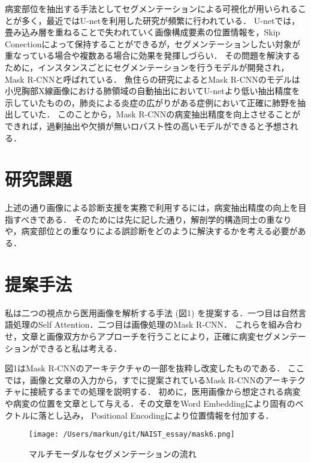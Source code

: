 \documentclass[a4j,10pt,twocolumn]{jarticle}
\begin{document}
病変部位を抽出する手法としてセグメンテーションによる可視化が用いられることが多く，最近ではU-netを利用した研究が頻繁に行われている\cite{近藤堅司2018u}．
U-netでは，畳み込み層を重ねることで失われていく画像構成要素の位置情報を，Skip Conectionによって保持することができるが，セグメンテーションしたい対象が重なっている場合や複数ある場合に効果を発揮しづらい．
その問題を解決するために，インスタンスごとにセグメンテーションを行うモデルが開発され，Mask R-CNNと呼ばれている\cite{he2017mask}．
魚住らの研究によるとMask R-CNNのモデルは小児胸部X線画像における肺領域の自動抽出においてU-netより低い抽出精度を示していたものの，肺炎による炎症の広がりがある症例において正確に肺野を抽出していた\cite{魚住春日2020mask}．
このことから，Mask R-CNNの病変抽出精度を向上させることができれば，過剰抽出や欠損が無いロバスト性の高いモデルができると予想される．

\section{研究課題}
上述の通り画像による診断支援を実務で利用するには，病変抽出精度の向上を目指すべきである．
そのためには先に記した通り，解剖学的構造同士の重なりや，病変部位との重なりによる誤診断をどのように解決するかを考える必要がある．

\section{提案手法}
私は二つの視点から医用画像を解析する手法 (図1) を提案する．一つ目は自然言語処理のSelf Attention\cite{vaswani2017attention}．二つ目は画像処理のMask R-CNN．
これらを組み合わせ，文章と画像双方からアプローチを行うことにより，正確に病変セグメンテーションができると私は考える．

図1はMask R-CNNのアーキテクチャの一部を抜粋し改変したものである．
ここでは，画像と文章の入力から，すでに提案されているMask R-CNNのアーキテクチャに接続するまでの処理を説明する．
初めに，医用画像から想定される病変や病変の位置を文章として与える．その文章をWord Embedding\cite{堅山耀太郎2017word}により固有のベクトルに落とし込み， Positional Encodingにより位置情報を付加する．

\begin{figure}[ht]%
    \texttt{[image: /Users/markun/git/NAIST\_essay/mask6.png]}
    \caption{マルチモーダルなセグメンテーションの流れ}
\end{figure}
\end{document}
